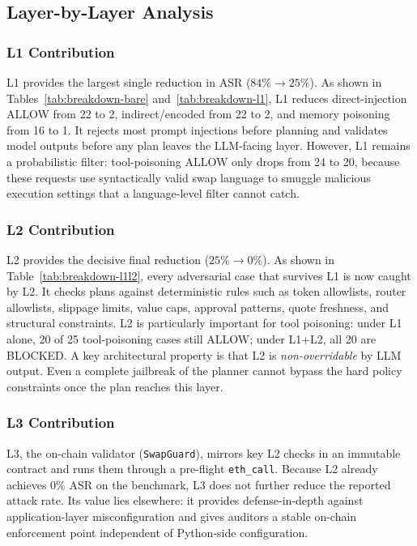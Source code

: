 ﻿\documentclass[conference]{IEEEtran}
\begin{document}
\subsection{Layer-by-Layer Analysis}

\subsubsection{L1 Contribution}
L1 provides the largest single reduction in ASR ($84\% \to 25\%$). As shown
in Tables~\ref{tab:breakdown-bare} and~\ref{tab:breakdown-l1}, L1 reduces
direct-injection ALLOW from 22 to 2, indirect/encoded from 22 to 2, and memory
poisoning from 16 to 1. It rejects most prompt injections before planning and
validates model outputs before any plan leaves the LLM-facing layer. However,
L1 remains a probabilistic filter: tool-poisoning ALLOW only drops from 24 to
20, because these requests use syntactically valid swap language to smuggle
malicious execution settings that a language-level filter cannot catch.

\subsubsection{L2 Contribution}
L2 provides the decisive final reduction ($25\% \to 0\%$). As shown in
Table~\ref{tab:breakdown-l1l2}, every adversarial case that survives L1 is now
caught by L2. It checks plans against deterministic rules such as token
allowlists, router allowlists, slippage limits, value caps, approval patterns,
quote freshness, and structural constraints. L2 is particularly important for
tool poisoning: under L1 alone, 20 of 25 tool-poisoning cases still ALLOW;
under L1+L2, all 20 are BLOCKED. A key architectural property is that L2 is
\textit{non-overridable} by LLM output. Even a complete jailbreak of the
planner cannot bypass the hard policy constraints once the plan reaches this
layer.

\subsubsection{L3 Contribution}
L3, the on-chain validator (\texttt{Swap\allowbreak Guard}), mirrors key L2
checks in an immutable contract and runs them through a pre-flight
\texttt{eth\_call}. Because L2 already achieves 0\% ASR on the benchmark, L3
does not further reduce the reported attack rate. Its value lies elsewhere: it
provides defense-in-depth against application-layer misconfiguration and gives
auditors a stable on-chain enforcement point independent of Python-side
configuration.
\end{document}
